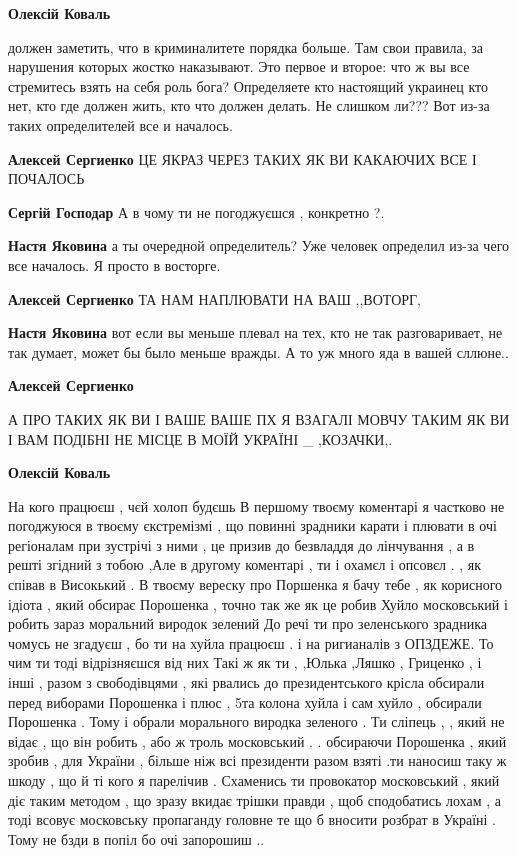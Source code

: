 \begin{itemize}
\begin{itemize}
\textbf{Олексій Коваль} 

должен заметить, что в криминалитете порядка больше. Там свои правила, за
нарушения которых жостко наказывают. Это первое и второе: что ж вы все
стремитесь взять на себя роль бога? Определяете кто настоящий украинец кто нет,
кто где должен жить, кто что должен делать. Не слишком ли??? Вот из-за таких
определителей все и началось.

\textbf{Алексей Сергиенко} ЦЕ ЯКРАЗ ЧЕРЕЗ ТАКИХ ЯК ВИ КАКАЮЧИХ ВСЕ І ПОЧАЛОСЬ

\textbf{Сергій Господар} А в чому ти не погоджуєшся , конкретно ?.

\textbf{Настя Яковина} а ты очередной определитель? Уже человек определил из-за чего все началось. Я просто в восторге.

\textbf{Алексей Сергиенко} ТА НАМ НАПЛЮВАТИ НА ВАШ ,,ВОТОРГ,

\textbf{Настя Яковина} вот если вы меньше плевал на тех, кто не так разговаривает, не так думает, может бы было меньше вражды. А то уж много яда в вашей сллюне..

\textbf{Алексей Сергиенко} 

А ПРО ТАКИХ ЯК ВИ І ВАШЕ ВАШЕ ПХ Я ВЗАГАЛІ МОВЧУ ТАКИМ ЯК ВИ І ВАМ ПОДІБНІ НЕ
МІСЦЕ В МОЇЙ УКРАЇНІ \_ ,КОЗАЧКИ,.

\textbf{Олексій Коваль} 

На кого працюєш , чєй холоп будєшь В першому твоєму коментарі я частково не
погоджуюся в твоєму єкстремізмі , що повинні зрадники карати і плювати в очі
регіоналам при зустрічі з ними , це призив до безвладдя до лінчування , а в
решті згідний з тобою ,Але в другому коментарі , ти і охамєл і опсовєл . , як
співав в Високький . В твоєму вереску про Поршенка я бачу тебе , як корисного
ідіота , який обсирає Порошенка , точно так же як це робив Хуйло московський і
робить зараз моральний виродок зелений До речі ти про зеленського зрадника
чомусь не згадуєш , бо ти на хуйла працюєш . і на ригианалів з ОПЗДЕЖЕ. То чим
ти тоді відрізняєшся від них Такі ж як ти , ,Юлька ,Ляшко , Гриценко , і інші ,
разом з свободівцями , які рвались до президентського крісла обсирали перед
виборами Порошенка і плюс , 5та колона хуйла і сам хуйло , обсирали Порошенка .
Тому і обрали морального виродка зеленого . Ти сліпець , , який не відає , що
він робить , або ж троль московський . . обсираючи Порошенка , який зробив ,
для України , більше ніж всі президенти разом взяті .ти наносиш таку ж шкоду ,
що й ті кого я парелічив . Схаменись ти провокатор московський , який діє таким
методом , що зразу вкидає трішки правди , щоб сподобатись лохам , а тоді всовує
московську пропаганду головне те що б вносити розбрат в Україні . Тому не бзди
в попіл бо очі запорошиш ..


\end{itemize}
\end{itemize}
